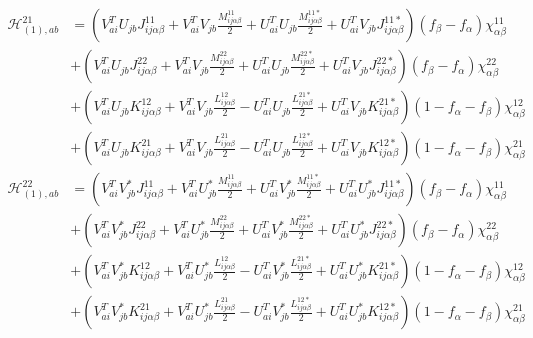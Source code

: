 \begin{align*}
\mathcal{H}_{(1),ab}^{21} 
&= \left(V^T_{ai} U_{jb} J_{ij\alpha\beta}^{11} + V_{ai}^T V_{jb} \frac{M_{ij\alpha\beta}^{11}}{2} + U_{ai}^T U_{jb} \frac{M_{ij\alpha\beta}^{11*}}{2} + U_{ai}^T V_{jb} J_{ij\alpha\beta}^{11*}  \right)(f_\beta-f_\alpha)\chi^{11}_{\alpha\beta}                   \\
&+ \left(V_{ai}^T U_{jb} J_{ij\alpha\beta}^{22} + V_{ai}^T V_{jb} \frac{M_{ij\alpha\beta}^{22}}{2} + U_{ai}^T U_{jb} \frac{M_{ij\alpha\beta}^{22*}}{2} + U_{ai}^T V_{jb} J_{ij\alpha\beta}^{22*}  \right)(f_\beta-f_\alpha)\chi^{22}_{\alpha\beta}                   \\
&+ \left(V_{ai}^T U_{jb} K_{ij\alpha\beta}^{12} + V_{ai}^T V_{jb} \frac{L_{ij\alpha\beta}^{12}}{2} - U_{ai}^T U_{jb} \frac{L_{ij\alpha\beta}^{21*}}{2} + U_{ai}^T V_{jb} K_{ij\alpha\beta}^{21*}  \right)\left(1-f_\alpha-f_\beta\right)\chi^{12}_{\alpha\beta}      \\
&+ \left(V_{ai}^T U_{jb} K_{ij\alpha\beta}^{21} + V_{ai}^T V_{jb} \frac{L_{ij\alpha\beta}^{21}}{2} - U_{ai}^T U_{jb} \frac{L_{ij\alpha\beta}^{12*}}{2} + U_{ai}^T V_{jb} K_{ij\alpha\beta}^{12*}  \right)\left(1-f_\alpha-f_\beta\right)\chi^{21}_{\alpha\beta}
\end{align*}
\begin{align*}
\mathcal{H}_{(1),ab}^{22} 
&= \left(V_{ai}^T V^*_{jb} J_{ij\alpha\beta}^{11} + V_{ai}^T U^*_{jb} \frac{M_{ij\alpha\beta}^{11}}{2} + U_{ai}^T V^*_{jb} \frac{M_{ij\alpha\beta}^{11*}}{2} + U_{ai}^T U^*_{jb} J_{ij\alpha\beta}^{11*}  \right)(f_\beta-f_\alpha)\chi^{11}_{\alpha\beta}                   \\
&+ \left(V_{ai}^T V^*_{jb} J_{ij\alpha\beta}^{22} + V_{ai}^T U^*_{jb} \frac{M_{ij\alpha\beta}^{22}}{2} + U_{ai}^T V^*_{jb} \frac{M_{ij\alpha\beta}^{22*}}{2} + U_{ai}^T U^*_{jb} J_{ij\alpha\beta}^{22*}  \right)(f_\beta-f_\alpha)\chi^{22}_{\alpha\beta}                   \\
&+ \left(V_{ai}^T V^*_{jb} K_{ij\alpha\beta}^{12} + V_{ai}^T U^*_{jb} \frac{L_{ij\alpha\beta}^{12}}{2} - U_{ai}^T V^*_{jb} \frac{L_{ij\alpha\beta}^{21*}}{2} + U_{ai}^T U^*_{jb} K_{ij\alpha\beta}^{21*}  \right)\left(1-f_\alpha-f_\beta\right)\chi^{12}_{\alpha\beta}      \\
&+ \left(V_{ai}^T V^*_{jb} K_{ij\alpha\beta}^{21} + V_{ai}^T U^*_{jb} \frac{L_{ij\alpha\beta}^{21}}{2} - U_{ai}^T V^*_{jb} \frac{L_{ij\alpha\beta}^{12*}}{2} + U_{ai}^T U^*_{jb} K_{ij\alpha\beta}^{12*}  \right)\left(1-f_\alpha-f_\beta\right)\chi^{21}_{\alpha\beta}
\end{align*}

